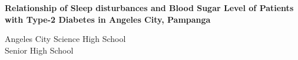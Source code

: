 \begin{titlepage}
    \centering
    \textbf{Relationship of Sleep disturbances and Blood Sugar Level of Patients with Type-2 Diabetes in Angeles City, Pampanga}
    \vspace{50pt}

    
    \vfill
    Angeles City Science High School\\
    Senior High School
\end{titlepage}
